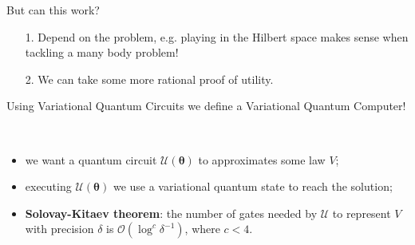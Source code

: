 \documentclass[aspectratio=169, 10pt, xcolor={svgnames}, hyperref={linkcolor=black}]{beamer}
\begin{document}
\begin{frame}{But can this work?}
\pause
\begin{itemize}[noitemsep]
\item[1.] Depend on the problem\pause, e.g. playing in the Hilbert space
makes sense when tackling a many body problem!
\pause
\item[2.] We can take some more rational proof of utility.
\end{itemize}
\pause
Using Variational Quantum Circuits we define a Variational Quantum Computer!
\pause
\begin{multicols}{2}
\texttt{\\}
\begin{itemize}
\item<7,8,9>[1.] we want a quantum circuit $\mathcal{U}(\bm{\theta})$ to approximates some law $V$;
\item<8,9>[2.] executing $\mathcal{U}(\bm{\theta})$ we use a variational quantum state
to reach the solution;
\item<9>[3.] \textbf{Solovay-Kitaev theorem}: the number of gates needed by $\mathcal{U}$ to
represent $V$ with precision $\delta$ is $\mathcal{O}(\log^c \delta^{-1})$, where
$c<4$.
\end{itemize}
\begin{figure}
\end{figure}
\end{multicols}
\end{frame}
\end{document}
